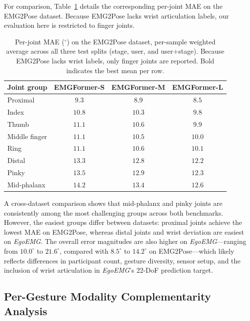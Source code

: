 \documentclass[letterpaper]{article} %
\newcommand{\dataset}{\textit{EgoEMG}}
\newcommand{\model}{EMGFormer}
\begin{document}
For comparison, Table~\ref{tab:per_joint_emg2pose} details the corresponding per-joint MAE on the EMG2Pose dataset. Because EMG2Pose lacks wrist articulation labels, our evaluation here is restricted to finger joints.

\begin{table}[t]
\centering
\caption{Per-joint MAE ($^\circ$) on the EMG2Pose dataset, per-sample weighted average across all three test splits (stage, user, and user+stage). Because EMG2Pose lacks wrist labels, only finger joints are reported. Bold indicates the best mean per row.}
\label{tab:per_joint_emg2pose}
\footnotesize
\setlength{\tabcolsep}{2.5pt}
\renewcommand{\arraystretch}{1.05}
\begin{tabular}{lccc}
\toprule
Joint group & \model{}-S & \model{}-M & \model{}-L \\
\midrule
Proximal & $9.3$ & $8.9$ & $\mathbf{8.5}$ \\
Index & $10.8$ & $10.3$ & $\mathbf{9.8}$ \\
Thumb & $11.1$ & $10.6$ & $\mathbf{9.9}$ \\
Middle finger & $11.1$ & $10.5$ & $\mathbf{10.0}$ \\
Ring & $11.1$ & $10.6$ & $\mathbf{10.1}$ \\
Distal & $13.3$ & $12.8$ & $\mathbf{12.2}$ \\
Pinky & $13.5$ & $12.9$ & $\mathbf{12.3}$ \\
Mid-phalanx & $14.2$ & $13.4$ & $\mathbf{12.6}$ \\
\bottomrule
\end{tabular}
\end{table}

A cross-dataset comparison shows that mid-phalanx and pinky joints are consistently among the most challenging groups across both benchmarks. However, the easiest groups differ between datasets: proximal joints achieve the lowest MAE on EMG2Pose, whereas distal joints and wrist deviation are easiest on \dataset{}. The overall error magnitudes are also higher on \dataset{}---ranging from $10.0^\circ$ to $21.6^\circ$, compared with $8.5^\circ$ to $14.2^\circ$ on EMG2Pose---which likely reflects differences in participant count, gesture diversity, sensor setup, and the inclusion of wrist articulation in \dataset{}'s 22-DoF prediction target.

\subsection{Per-Gesture Modality Complementarity Analysis}
\label{app:per_gesture}
\end{document}
